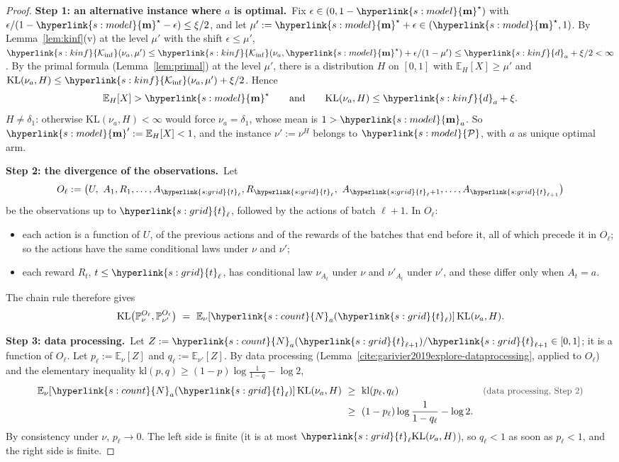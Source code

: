 \documentclass[10pt]{article}
\newcommand{\sy}[2]{{\hyperlink{#1}{#2}}}
\newcommand{\E}{\mathbb{E}}
\newcommand{\PP}{\mathbb{P}}
\newcommand{\1}{\mathbf{1}}
\newcommand{\KL}{\mathrm{KL}}
\newcommand{\kl}{\mathrm{kl}}
\newcommand{\m}{\sy{s:model}{\mathbf{m}}}
\newcommand{\cP}{\sy{s:model}{\mathcal P}}
\newcommand{\Ki}{\sy{s:kinf}{\mathcal K_{\inf}}}
\newcommand{\da}{\sy{s:kinf}{d}_a}
\newcommand{\Ng}{\sy{s:count}{N}}
\newcommand{\tl}{\sy{s:grid}{t}}
\newcommand{\stp}[2]{\par\medskip\noindent\textbf{Step #1: #2.}\ }
\newcommand{\why}[1]{\text{\small\color{black!70}(#1)}}
\begin{document}
\begin{proof}
\stp1{an alternative instance where $a$ is optimal}Fix $\epsilon\in(0,1-\m^\star)$ with $\epsilon/(1-\m^\star-\epsilon)\le\xi/2$, and let
$\mu':=\m^\star+\epsilon\in(\m^\star,1)$. By Lemma~\ref{lem:kinf}(v) at the level $\mu'$ with the shift $\epsilon\le\mu'$,
$\Ki(\nu_a,\mu')\le\Ki(\nu_a,\m^\star)+\epsilon/(1-\mu')\le\da+\xi/2<\infty$. By the primal formula
(Lemma~\ref{lem:primal}) at the level $\mu'$, there is a distribution $H$ on $[0,1]$ with
$\E_H[X]\ge\mu'$ and $\KL(\nu_a,H)\le\Ki(\nu_a,\mu')+\xi/2$. Hence
\[
\E_H[X]>\m^\star\qquad\text{and}\qquad\KL(\nu_a,H)\le\da+\xi .
\]
$H\ne\delta_1$: otherwise $\KL(\nu_a,H)<\infty$ would force $\nu_a=\delta_1$, whose mean is $1>\m_a$. So $\m':=\E_H[X]<1$, and the instance $\nu':=\nu^H$ belongs to
$\cP$, with $a$ as unique optimal arm.

\stp2{the divergence of the observations}Let
\[
O_\ell:=\big(U,\ A_1,R_1,\dots,A_{\tl_\ell},R_{\tl_\ell},\ A_{\tl_\ell+1},\dots,A_{\tl_{\ell+1}}\big)
\]
be the observations up to $\tl_\ell$, followed by the actions of batch $\ell+1$. In $O_\ell$:
\begin{itemize}
\item each action is a function of $U$, of the previous actions and of the rewards of the batches that end before it, all of which precede it in $O_\ell$; so the actions
have the same conditional laws under $\nu$ and $\nu'$;
\item each reward $R_t$, $t\le\tl_\ell$, has conditional law $\nu_{A_t}$ under $\nu$ and $\nu'_{A_t}$ under $\nu'$, and these differ only when $A_t=a$.
\end{itemize}
The chain rule \citep[Lemma~15.1]{LS} therefore gives
\[
\KL\big(\PP_\nu^{O_\ell},\PP_{\nu'}^{O_\ell}\big)\ =\ \E_\nu[\Ng_a(\tl_\ell)]\,\KL(\nu_a,H).
\]

\stp3{data processing}Let $Z:=\Ng_a(\tl_{\ell+1})/\tl_{\ell+1}\in[0,1]$; it is a function of $O_\ell$. Let $p_\ell:=\E_\nu[Z]$ and $q_\ell:=\E_{\nu'}[Z]$. By data processing (Lemma~\ref{cite:garivier2019explore-dataprocessing}, applied to $O_\ell$) and
the elementary inequality $\kl(p,q)\ge(1-p)\log\frac1{1-q}-\log2$,
\begin{align*}
\E_\nu[\Ng_a(\tl_\ell)]\,\KL(\nu_a,H)\ &\ge\ \kl(p_\ell,q_\ell)&&\why{data processing, Step~2}\\
&\ge\ (1-p_\ell)\log\frac1{1-q_\ell}-\log2 .
\end{align*}
By consistency under $\nu$, $p_\ell\to0$. The left side is finite (it is at most $\tl_\ell\KL(\nu_a,H)$), so $q_\ell<1$ as soon as $p_\ell<1$, and the right side is finite.


\end{proof}
\end{document}
